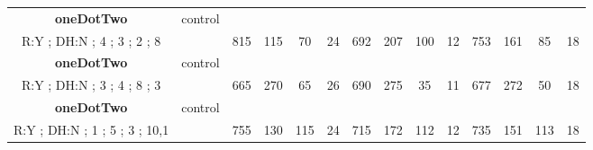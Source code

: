 \begin{table}[]
{\begin{tabular}{|c|c|c|c|c|c|c|c|c|c|c|c|c|c|}
\cellcolor{blue!15}\textbf{oneDotTwo} & control& {\color[HTML]{00009B} } & {\color[HTML]{9A0000} } & {\color[HTML]{009901} } &  & {\color[HTML]{00009B} } & {\color[HTML]{9A0000} } & {\color[HTML]{009901} } &  & {\color[HTML]{00009B} } & {\color[HTML]{9A0000} } & {\color[HTML]{009901} } &  \\ 
\cellcolor{ blue!15}R:Y ; DH:N ; 4 ; 3 ; 2 ; 8 &  & \multirow{-2}{*}{{\color[HTML]{00009B} 815}} & \multirow{-2}{*}{{\color[HTML]{9A0000} 115}} & \multirow{-2}{*}{{\color[HTML]{009901} 70}} & \multirow{-2}{*}{24} & \multirow{-2}{*}{{\color[HTML]{00009B} 692}} & \multirow{-2}{*}{{\color[HTML]{9A0000} 207}} & \multirow{-2}{*}{{\color[HTML]{009901} 100}} & \multirow{-2}{*}{12} & \multirow{-2}{*}{{\color[HTML]{00009B} 753}} & \multirow{-2}{*}{{\color[HTML]{9A0000} 161}} & \multirow{-2}{*}{{\color[HTML]{009901} 85}} & \multirow{-2}{*}{18} \\ \hline

\cellcolor{blue!15}\textbf{oneDotTwo} & control& {\color[HTML]{00009B} } & {\color[HTML]{9A0000} } & {\color[HTML]{009901} } &  & {\color[HTML]{00009B} } & {\color[HTML]{9A0000} } & {\color[HTML]{009901} } &  & {\color[HTML]{00009B} } & {\color[HTML]{9A0000} } & {\color[HTML]{009901} } &  \\ 
\cellcolor{ blue!15}R:Y ; DH:N ; 3 ; 4 ; 8 ; 3 &  & \multirow{-2}{*}{{\color[HTML]{00009B} 665}} & \multirow{-2}{*}{{\color[HTML]{9A0000} 270}} & \multirow{-2}{*}{{\color[HTML]{009901} 65}} & \multirow{-2}{*}{26} & \multirow{-2}{*}{{\color[HTML]{00009B} 690}} & \multirow{-2}{*}{{\color[HTML]{9A0000} 275}} & \multirow{-2}{*}{{\color[HTML]{009901} 35}} & \multirow{-2}{*}{11} & \multirow{-2}{*}{{\color[HTML]{00009B} 677}} & \multirow{-2}{*}{{\color[HTML]{9A0000} 272}} & \multirow{-2}{*}{{\color[HTML]{009901} 50}} & \multirow{-2}{*}{18} \\ \hline

\cellcolor{blue!15}\textbf{oneDotTwo} & control& {\color[HTML]{00009B} } & {\color[HTML]{9A0000} } & {\color[HTML]{009901} } &  & {\color[HTML]{00009B} } & {\color[HTML]{9A0000} } & {\color[HTML]{009901} } &  & {\color[HTML]{00009B} } & {\color[HTML]{9A0000} } & {\color[HTML]{009901} } &  \\ 
\cellcolor{ blue!15}R:Y ; DH:N ; 1 ; 5 ; 3 ; 10,1 &  & \multirow{-2}{*}{{\color[HTML]{00009B} 755}} & \multirow{-2}{*}{{\color[HTML]{9A0000} 130}} & \multirow{-2}{*}{{\color[HTML]{009901} 115}} & \multirow{-2}{*}{24} & \multirow{-2}{*}{{\color[HTML]{00009B} 715}} & \multirow{-2}{*}{{\color[HTML]{9A0000} 172}} & \multirow{-2}{*}{{\color[HTML]{009901} 112}} & \multirow{-2}{*}{12} & \multirow{-2}{*}{{\color[HTML]{00009B} 735}} & \multirow{-2}{*}{{\color[HTML]{9A0000} 151}} & \multirow{-2}{*}{{\color[HTML]{009901} 113}} & \multirow{-2}{*}{18} \\ \hline


\end{tabular}}
\end{table}
